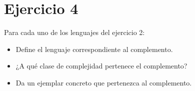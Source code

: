 \section{Ejercicio 4}

\begin{tcolorbox}[enunciado]
Para cada uno de los lenguajes del ejercicio 2:
\begin{itemize}[leftmargin=*]
    \item Define el lenguaje correspondiente al complemento.
    \item ¿A qué clase de complejidad pertenece el complemento?
    \item Da un ejemplar concreto que pertenezca al complemento.
\end{itemize}
\end{tcolorbox}

